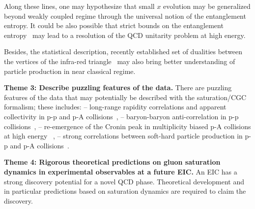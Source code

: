 Along these lines, one may hypothesize that small $x$ evolution may be generalized beyond 
weakly coupled regime through the universal notion of the entanglement entropy. 
It could be also possible  that strict bounds on the entanglement entropy~\cite{Holzhey:1994we,Calabrese:2005zw}
may lead 
to a resolution of the QCD unitarity problem at high energy. 

Besides, the statistical description, recently established set of dualities between the vertices 
of the infra-red triangle~\cite{Strominger:2017zoo,Pate:2017vwa,Ball:2018prg} may also bring better understanding of particle production in near classical regime. 

\vspace{0.5em}



\noindent

{\bf Theme 3:  Describe puzzling features of the data. }
There are puzzling features of the data that may potentially be described 
with the saturation/CGC formalism; these includes: 
-- long-range rapidity correlations and apparent collectivity in p-p and p-A 
collisions~\cite{Khachatryan:2010nk,Aad:2010ac,Aaij:2014pza,ALICE:2017pcy},  
-- baryon-baryon anti-correlation in p-p collisions~\cite{Adam:2016iwf}, 
-- re-emergence of the Cronin peak in multiplicity biased p-A collisions at high energy~\cite{ALICE:2012mj} , 
-- strong correlations between soft-hard particle production in p-p and p-A collisions~\cite{ATLAS:2014cpa,Aad:2015ziq}. 


\vspace{0.5em}

\noindent

{\bf Theme 4:  Rigorous theoretical predictions 
on gluon saturation dynamics in experimental observables at a future EIC.}
An EIC has a strong discovery potential 
for a novel QCD phase. Theoretical development and in particular 
predictions based on saturation dynamics are required to claim  the discovery. 

\vspace{2em}

